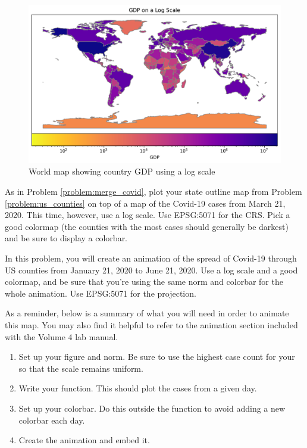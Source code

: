 \begin{figure}[H]
\begin{center}
\includegraphics[scale=.65]{figures/world_log.pdf}
\end{center}
\caption{World map showing country GDP using a log scale}
\label{figure:log_world}
\end{figure}

\begin{problem}
As in Problem \ref{problem:merge_covid}, plot your state outline map from Problem \ref{problem:us_counties} on top of a map of the Covid-19 cases from March 21, 2020.
This time, however, use a log scale.
Use EPSG:5071 for the CRS.
Pick a good colormap (the counties with the most cases should generally be darkest) and be sure to display a colorbar.
\end{problem}

\begin{problem}
In this problem, you will create an animation of the spread of Covid-19 through US counties from January 21, 2020 to June 21, 2020.
Use a log scale and a good colormap, and be sure that you're using the same norm and colorbar for the whole animation.
Use EPSG:5071 for the projection.

As a reminder, below is a summary of what you will need in order to animate this map.
You may also find it helpful to refer to the animation section included with the Volume 4 lab manual.

\begin{enumerate}
	\item Set up your figure and norm. Be sure to use the highest case count for your  so that the scale remains uniform.
	\item Write your  function. This should plot the cases from a given day.
	\item Set up your colorbar. Do this outside the  function to avoid adding a new colorbar each day.
	\item Create the animation and embed it.
\end{enumerate}
\end{problem}
